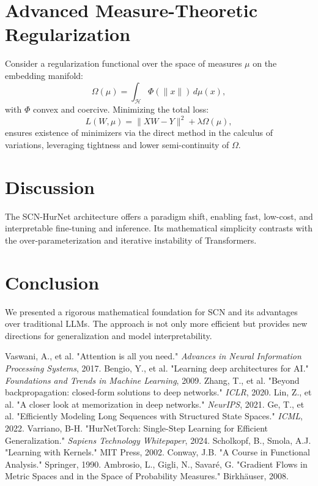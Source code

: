 \documentclass[11pt]{article}
\begin{document}
\section{Advanced Measure-Theoretic Regularization}
Consider a regularization functional over the space of measures $\mu$ on the embedding manifold:
\begin{equation}
\Omega(\mu) = \int_{\mathcal{H}} \Phi(\|x\|) \, d\mu(x),
\end{equation}
with $\Phi$ convex and coercive. Minimizing the total loss:
\begin{equation}
L(W, \mu) = \|XW - Y\|^2 + \lambda \Omega(\mu),
\end{equation}
ensures existence of minimizers via the direct method in the calculus of variations, leveraging tightness and lower semi-continuity of $\Omega$.

\section{Discussion}
The SCN-HurNet architecture offers a paradigm shift, enabling fast, low-cost, and interpretable fine-tuning and inference. Its mathematical simplicity contrasts with the over-parameterization and iterative instability of Transformers.

\section{Conclusion}
We presented a rigorous mathematical foundation for SCN and its advantages over traditional LLMs. The approach is not only more efficient but provides new directions for generalization and model interpretability.

\newpage
\begin{thebibliography}{9}
 Vaswani, A., et al. "Attention is all you need." \textit{Advances in Neural Information Processing Systems}, 2017.
 Bengio, Y., et al. "Learning deep architectures for AI." \textit{Foundations and Trends in Machine Learning}, 2009.
 Zhang, T., et al. "Beyond backpropagation: closed-form solutions to deep networks." \textit{ICLR}, 2020.
 Lin, Z., et al. "A closer look at memorization in deep networks." \textit{NeurIPS}, 2021.
 Ge, T., et al. "Efficiently Modeling Long Sequences with Structured State Spaces." \textit{ICML}, 2022.
 Varriano, B-H. "HurNetTorch: Single-Step Learning for Efficient Generalization." \textit{Sapiens Technology Whitepaper}, 2024.
 Scholkopf, B., Smola, A.J. "Learning with Kernels." MIT Press, 2002.
 Conway, J.B. "A Course in Functional Analysis." Springer, 1990.
 Ambrosio, L., Gigli, N., Savaré, G. "Gradient Flows in Metric Spaces and in the Space of Probability Measures." Birkhäuser, 2008.
\end{thebibliography}
\end{document}
